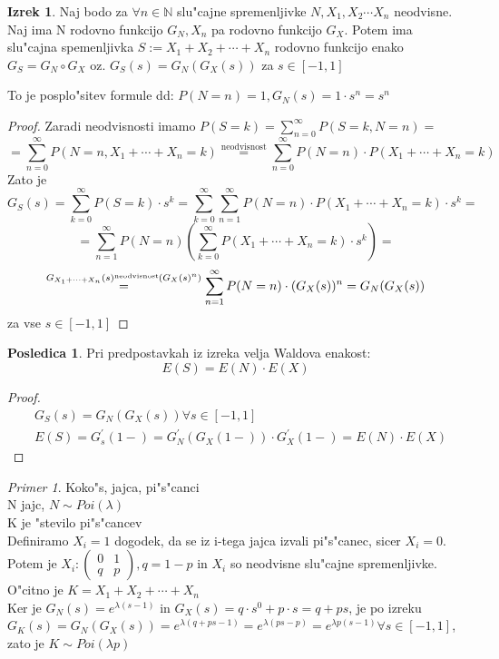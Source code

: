 \documentclass[a4paper,12pt]{article}
\theoremstyle{definition}
\newtheorem{conseq}[counter]{Posledica}
\newtheorem{theorem}[counter]{Izrek}
\theoremstyle{remark}
\newtheorem*{ex}{Primer}
\newcommand{\N}{\mathbb{N}}
\begin{document}
\begin{theorem}
    Naj bodo za $\forall n \in \N$ slu"cajne spremenljivke $N, X_1, X_2 \cdots X_n$ neodvisne. Naj ima N rodovno
    funkcijo $G_N, X_n$ pa rodovno funkcijo $G_X$. Potem ima slu"cajna spemenljivka $S := X_1 + X_2 + \cdots + X_n$
    rodovno funkcijo enako $G_S = G_N \circ G_X$ oz. $G_S(s) = G_N(G_X(s))$ za $s \in [-1,1]$
\end{theorem}

To je posplo"sitev formule dd: $P(N = n) = 1, G_N(s) = 1 \cdot s^n = s^n$%

\begin{proof}
    Zaradi neodvisnosti imamo $P(S = k) = \sum_{n=0}^{\infty} P(S = k, N = n) =$
    \[= \sum_{n=0}^{\infty} P(N = n, X_1 + \cdots + X_n = k) \stackrel{\text{neodvisnost}}{=}
    \sum_{n=0}^{\infty} P(N = n) \cdot P(X_1 + \cdots + X_n = k)\]
    Zato je
    \[G_S(s) = \sum_{k=0}^{\infty} P(S = k) \cdot s^k =
    \sum_{k=0}^{\infty} \sum_{n=1}^{\infty} P(N = n) \cdot P(X_1 + \cdots + X_n = k) \cdot s^k =\]
    \[= \sum_{n=1}^{\infty} P(N = n) (\sum_{k=0}^{\infty} P(X_1 + \cdots + X_n = k) \cdot s^k) =\]
    \[\stackrel{G_{X_1 + \cdots + X_n}(s) \stackrel{\text{neodvisnost}}{\*} (G_X(s)^n)}{=}
    \sum_{n=1}^{\infty} P(N = n) \cdot (G_X(s))^n = G_N(G_X(s))\]
    za vse $s \in [-1,1]$
\end{proof}




\begin{conseq}
	Pri predpostavkah iz izreka velja Waldova enakost: \[E(S) = E(N) \cdot E(X)\]
\end{conseq}

\begin{proof}
    \begin{align}
    &G_S(s) = G_N(G_X(s)) \forall s \in [-1,1] \\
    &E(S) = G_s^{'}(1-) = G_N^{'}(G_X(1-)) \cdot G_X^{'}(1-) = E(N) \cdot E(X)
    \end{align}
\end{proof}

\begin{ex}
    Koko"s, jajca, pi"s"canci \\
    N jajc, $N \sim Poi(\lambda)$ \\
    K je "stevilo pi"s"cancev \\
    Definiramo $X_i = 1$ dogodek, da se iz i-tega jajca izvali pi"s"canec, sicer $X_i = 0$. Potem je
    $X_i: \begin{pmatrix}
        0 & 1 \\
        q & p
    \end{pmatrix}, q = 1 - p$ in $X_i$ so neodvisne slu"cajne spremenljivke. \\
    O"citno je $K = X_1 + X_2 + \cdots + X_n$ \\
    Ker je $G_N(s) = e^{\lambda(s-1)}$ in $G_X(s) = q \cdot s^0 + p \cdot s = q + ps$, je po
    izreku $G_K(s) = G_N(G_X(s)) = e^{\lambda(q + ps - 1)} = e^{\lambda(ps - p)} = e^{\lambda p(s-1)} \forall s \in [-1,1]$,
    zato je $K \sim Poi(\lambda p)$
\end{ex}
\end{document}
